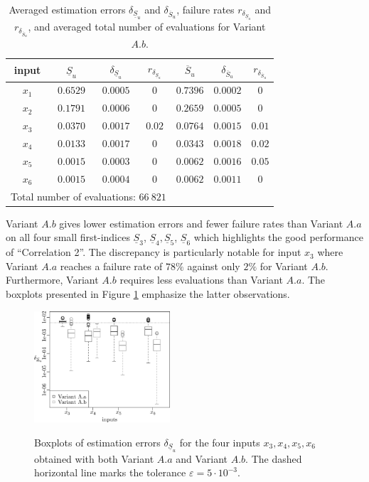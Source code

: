 \begin{table}[t]
\caption{Averaged estimation errors $\delta_{\underline{S}_u}$ and $\delta_{\overline{S}_u}$, failure rates $r_{\delta_{\underline{S}_u}}$ and $r_{\delta_{\overline{S}_u}}$, and averaged total number of evaluations for Variant $A.b$.}
\centering
\begin{tabular}{ccccccc}
\hline
 input & $\underline{S}_u$ & $\delta_{\underline{S}_u}$ & $r_{\delta_{\underline{S}_u}}$ & $\overline{S}_u$ & $\delta_{\overline{S}_u}$ & $r_{\delta_{\overline{S}_u}}$ \\ \hline
 $x_1$ & $0.6529$ &  $0.0005$ & $0$ & $0.7396$ & $0.0002$ & $0$ \\ \hline
 $x_2$ & $0.1791$ &  $0.0006$ & $0$ & $0.2659$ & $0.0005$ & $0$ \\ \hline
 $x_3$ & $0.0370$ &  $0.0017$ & $0.02$ & $0.0764$ & $0.0015$ & $0.01$ \\ \hline
 $x_4$ & $0.0133$ &  $0.0017$ & $0$ & $0.0343$ & $0.0018$ & $0.02$ \\ \hline
 $x_5$ & $0.0015$ &  $0.0003$ & $0$ & $0.0062$ & $0.0016$ & $0.05$ \\ \hline
 $x_6$ & $0.0015$ &  $0.0004$ & $0$  & $0.0062$ & $0.0011$ & $0$ \\ \hline \hline
\multicolumn{4}{l}{Total number of evaluations: $66 \ 821$} & & &\\ \hline 
\end{tabular}
\label{res.bratley.Ab}
\end{table}

Variant $A.b$ gives lower estimation errors and fewer failure rates than Variant $A.a$ on all four small first-indices $\underline{S}_3$, $\underline{S}_4,\underline{S}_5$, $\underline{S}_6$ which highlights the good performance of ``Correlation 2''. The discrepancy is particularly notable for input $x_3$ where Variant $A.a$ reaches a failure rate of $78\%$ against only $2\%$ for Variant $A.b$. Furthermore, Variant $A.b$ requires less evaluations than Variant $A.a$. The boxplots presented in Figure \ref{boxplots.bratley} emphasize the latter observations.
\begin{figure}[t]
\caption{Boxplots of estimation errors $\delta_{\underline{S}_u}$ for the four inputs $x_3,x_4,x_5,x_6$ obtained with both Variant $A.a$ and Variant $A.b$. The dashed horizontal line marks the tolerance $\varepsilon=5\cdot 10^{-3}$.}
\vspace*{0.2cm}
\centering
\includegraphics[width=0.45\textwidth]{Fig3.eps}
\label{boxplots.bratley}
\end{figure}

